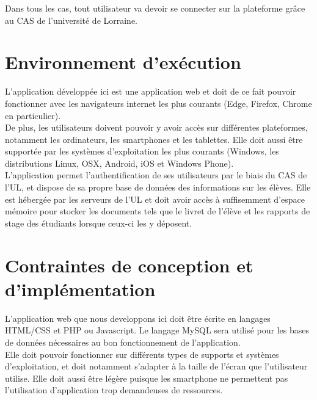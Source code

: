 \documentclass{scrreprt}
\begin{document}
\hspace{0.6cm}Dans tous les cas, tout utilisateur va devoir se connecter sur la plateforme grâce au CAS de l'université de Lorraine.

\section{Environnement d'exécution}
\hspace{1cm}L'application développée ici est une application web et doit de ce fait pouvoir fonctionner avec les navigateurs internet les plus courants (Edge, Firefox, Chrome en particulier).\\

\hspace{0.6cm}De plus, les utilisateurs doivent pouvoir y avoir accès sur différentes plateformes, notamment les ordinateurs, les smartphones et les tablettes. Elle doit aussi être supportée par les systèmes d'exploitation les plus courants (Windows, les distributions Linux, OSX, Android, iOS et Windows Phone).\\

\hspace{0.6cm}L'application permet l'authentification de ses utilisateurs par le biais du CAS de l'UL, et dispose de sa propre base de données des informations sur les élèves. Elle est hébergée par les serveurs de l'UL et doit avoir accès à suffisemment d'espace mémoire pour stocker les documents tels que le livret de l'élève et les rapports de stage des étudiants lorsque ceux-ci les y déposent.


\section{Contraintes de conception et d'implémentation}
\hspace{1cm}L'application web que nous developpons ici doit être écrite en langages HTML/CSS et PHP ou Javascript. Le langage MySQL sera utilisé pour les bases de données nécessaires au bon fonctionnement de l'application.\\

\hspace{0.6cm}Elle doit pouvoir fonctionner sur différents types de supports et systèmes d'exploitation, et doit notamment s'adapter à la taille de l'écran que l'utilisateur utilise. Elle doit aussi être légère puisque les smartphone ne permettent pas l'utilisation d'application trop demandeuses de ressources.\\
\end{document}
